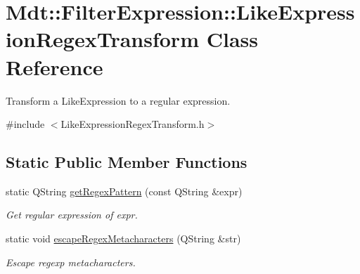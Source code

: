 \hypertarget{class_mdt_1_1_filter_expression_1_1_like_expression_regex_transform}{}\section{Mdt\+:\+:Filter\+Expression\+:\+:Like\+Expression\+Regex\+Transform Class Reference}
\label{class_mdt_1_1_filter_expression_1_1_like_expression_regex_transform}


Transform a Like\+Expression to a regular expression.  




{\ttfamily \#include $<$Like\+Expression\+Regex\+Transform.\+h$>$}

\subsection*{Static Public Member Functions}
\begin{DoxyCompactItemize}
\item 
static Q\+String \hyperlink{class_mdt_1_1_filter_expression_1_1_like_expression_regex_transform_a64ad9e380e0c12abc8f6bcdfaf642255}{get\+Regex\+Pattern} (const Q\+String \&expr)\hypertarget{class_mdt_1_1_filter_expression_1_1_like_expression_regex_transform_a64ad9e380e0c12abc8f6bcdfaf642255}{}\label{class_mdt_1_1_filter_expression_1_1_like_expression_regex_transform_a64ad9e380e0c12abc8f6bcdfaf642255}

\begin{DoxyCompactList}\small\item\em Get regular expression of expr. \end{DoxyCompactList}\item 
static void \hyperlink{class_mdt_1_1_filter_expression_1_1_like_expression_regex_transform_a0beac0e2295cfa541e2511e814c54b8f}{escape\+Regex\+Metacharacters} (Q\+String \&str)\hypertarget{class_mdt_1_1_filter_expression_1_1_like_expression_regex_transform_a0beac0e2295cfa541e2511e814c54b8f}{}\label{class_mdt_1_1_filter_expression_1_1_like_expression_regex_transform_a0beac0e2295cfa541e2511e814c54b8f}

\begin{DoxyCompactList}\small\item\em Escape regexp metacharacters. \end{DoxyCompactList}\end{DoxyCompactItemize}


